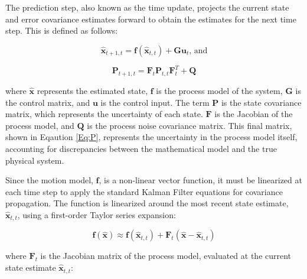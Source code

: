 \label{sec:Prediction}

The prediction step, also known as the time update, projects the current state and error covariance estimates forward to obtain the estimates for the next time step. 
This is defined as follows:

\begin{equation}
    \mathbf{\hat{x}}_{t+1,t} = \mathbf{f}(\mathbf{\hat{x}}_{t,t}) + \mathbf{G}\mathbf{u}_t \text{, and}
\end{equation}

\begin{equation}
    \mathbf{P}_{t+1,t} = \mathbf{F}_t\mathbf{P}_{t,t}\mathbf{F}_t^T + \mathbf{Q}
    \label{Eq:P}
\end{equation}

\noindent
where $\mathbf{\hat{x}}$ represents the estimated state, $\mathbf{f}$ is the process model of the system, $\mathbf{G}$ is the control matrix, and $\mathbf{u}$ is the control input. 
The term $\mathbf{P}$ is the state covariance matrix, which represents the uncertainty of each state. $\mathbf{F}$ is the Jacobian of the process model, and $\mathbf{Q}$ is the 
process noise covariance matrix. This final matrix, shown in Eqaution \ref{Eq:P}, represents the uncertainty in the process model itself, accounting for discrepancies between the mathematical model and the 
true physical system.
\vspace{0.5cm}

\noindent
Since the motion model, $\mathbf{f}$, is a non-linear vector function, it must be linearized at each time step to apply the standard Kalman Filter equations for covariance 
propagation. The function is linearized around the most recent state estimate, $\mathbf{\hat{x}}_{t,t}$, using a first-order Taylor series expansion:

\begin{equation}
    \mathbf{f}(\mathbf{\hat{x}}) \approx \mathbf{f}(\mathbf{\hat{x}}_{t,t}) + \mathbf{F}_t(\mathbf{\hat{x}}-\mathbf{\hat{x}}_{t,t})
\end{equation}

\noindent
where $\mathbf{F}_t$ is the Jacobian matrix of the process model, evaluated at the current state estimate $\mathbf{\hat{x}}_{t,t}$:

